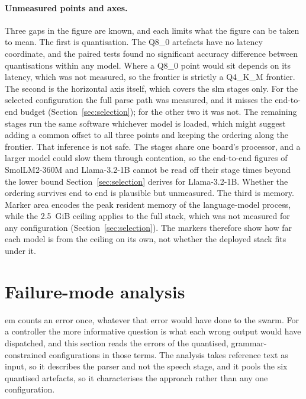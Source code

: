 \paragraph{Unmeasured points and axes.} Three gaps in the figure are known, and each limits what
the figure can be taken to mean. The first is quantisation. The Q8\_0 artefacts have no
latency coordinate, and the paired tests found no significant accuracy difference between
quantisations within any model. Where a Q8\_0 point would sit depends on its latency,
which was not measured, so the frontier is strictly a Q4\_K\_M frontier.
The second is the horizontal axis itself, which covers the \gls{slm} stages only. For
the selected configuration the full parse path was measured, and it misses the end-to-end
budget (Section~\ref{sec:selection}); for the other two it was not. The remaining stages run the
same software whichever model is loaded, which might suggest adding a common offset to all three
points and keeping the ordering along the frontier. That inference is not safe. The stages share
one board's processor, and a larger model could slow them through contention, so the end-to-end
figures of SmolLM2-360M and Llama-3.2-1B cannot be read off their stage times beyond the lower
bound Section~\ref{sec:selection} derives for Llama-3.2-1B. Whether the ordering survives end to
end is plausible but unmeasured. The third is memory. Marker area encodes the peak resident memory
of the language-model process, while the 2.5~GiB ceiling applies to the full stack, which was not
measured for any configuration (Section~\ref{sec:selection}). The markers therefore show how far
each model is from the ceiling on its own, not whether the deployed stack fits under it.

\section{Failure-mode analysis}
\label{sec:failure-modes}

\Gls{em} counts an error once, whatever that error would have done to the swarm. For a
controller the more informative question is what each wrong output would have dispatched, and this
section reads the errors of the quantised, grammar-constrained configurations in those terms. The
analysis takes reference text as input, so it describes the parser and not the speech stage, and it
pools the six quantised artefacts, so it characterises the approach rather than any one
configuration.

